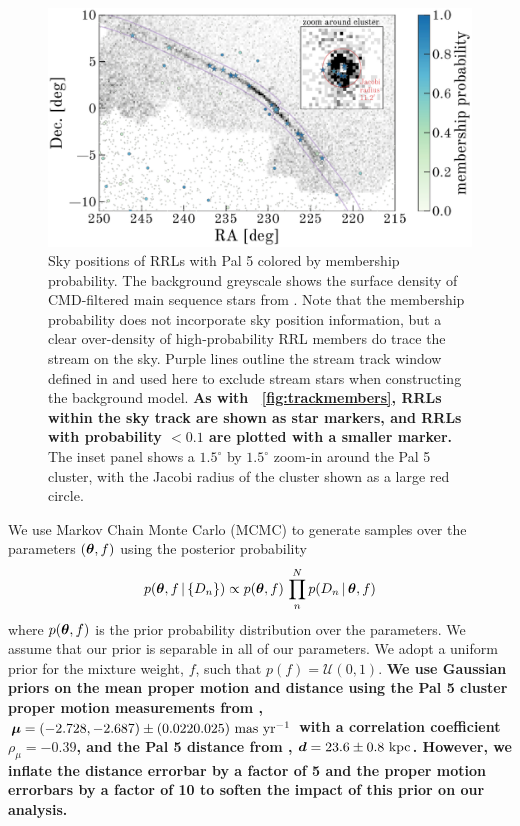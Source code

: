 \documentclass[twocolumn]{aastex63}
\newcommand{\changes}[1]{{\textbf{#1}}}
\begin{document}
\begin{figure}[t]
\begin{center}
\includegraphics[width=\textwidth]{members.pdf}
\caption{Sky positions of RRLs with Pal 5 colored by membership probability.
The background greyscale shows the surface density of CMD-filtered main sequence stars from \citet{Bonaca:2019}.
Note that the membership probability does not incorporate sky position information, but a clear over-density of high-probability RRL members do trace the stream on the sky.
Purple lines outline the stream track window defined in \citet{Bonaca:2019} and used here to exclude stream stars when constructing the background model.
\changes{As with \figurename~\ref{fig:trackmembers}, RRLs within the sky track are shown as star markers, and RRLs with probability $<0.1$ are plotted with a smaller marker.}
The inset panel shows a $1.5^\circ$ by $1.5^\circ$ zoom-in around the Pal 5 cluster, with the Jacobi radius of the cluster shown as a large red circle.
}
\label{fig:members}
\end{center}
\end{figure}

We use Markov Chain Monte Carlo (MCMC) to generate samples over the parameters $(\boldsymbol{\theta}, f)$ using the posterior probability
\begin{equation}
    p(\bs{\theta}, f \given \{D_n\}) \propto p(\bs{\theta}, f) \, \prod_n^N p(D_n \given \bs{\theta}, f)
\end{equation}
where $p(\boldsymbol{\theta}, f)$ is the prior probability distribution over the parameters.
We assume that our prior is separable in all of our parameters.
We adopt a uniform prior for the mixture weight, $f$, such that $p(f) = \mathcal{U}(0, 1)$.
\changes{We use Gaussian priors on the mean proper motion and distance using the Pal 5 cluster proper motion measurements from \citet{Vasiliev:2019}, $\boldsymbol{\mu} = (-2.728, -2.687) \pm (0.022	0.025)~\mathrm{mas}~\mathrm{yr}^{-1}$ with a correlation coefficient $\rho_\mu = -0.39$, and the Pal 5 distance from \citet{Kuepper:2015}, $\boldsymbol{d} = 23.6 \pm 0.8~\mathrm{kpc}$.
However, we inflate the distance errorbar by a factor of 5 and the proper motion errorbars by a factor of 10 to soften the impact of this prior on our analysis.}
\end{document}
